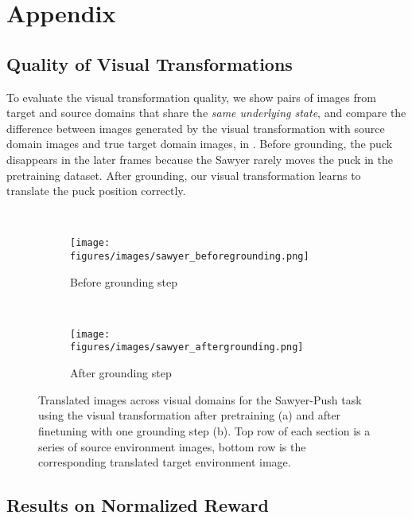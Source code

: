 \appendix
\section{Appendix}


\subsection{Quality of Visual Transformations}

To evaluate the visual transformation quality, we show pairs of images from target and source domains that share the \textit{same underlying state}, and compare the difference between images generated by the visual transformation with source domain images and true target domain images, in . Before grounding, the puck disappears in the later frames because the Sawyer rarely moves the puck in the pretraining dataset.  After grounding, our visual transformation learns to translate the puck position correctly. 


\begin{figure}[hb]
    \centering
    \begin{subfigure}[t]{\linewidth}
        \centering
    \end{subfigure}
    \\
    \begin{subfigure}{\linewidth}
        \centering
        \texttt{[image: figures/images/sawyer\_beforegrounding.png]}
        \caption{Before grounding step}
    \end{subfigure} 
    \\
    \begin{subfigure}{\linewidth}
        \centering
        \texttt{[image: figures/images/sawyer\_aftergrounding.png]}
        \caption{After grounding step}
    \end{subfigure}
    \caption{
        Translated images across visual domains for the Sawyer-Push task using the visual transformation after pretraining (a) and after finetuning with one grounding step (b).  
        Top row of each section is a series of source environment images, bottom row is the corresponding translated target environment image.  
    }
    \label{fig:gen_imgs}
\end{figure}


\subsection{Results on Normalized Reward}

